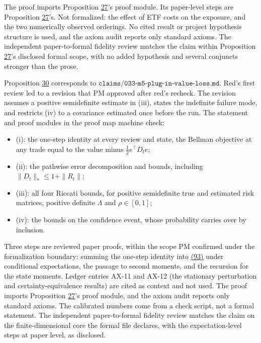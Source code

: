 \documentclass[11pt]{article}
\begin{document}
The proof imports Proposition \hyperref[res:Proposition-27]{27}'s proof module. Its paper-level
steps are Proposition \hyperref[res:Proposition-27]{27}'s. Not formalized: the effect of ETF costs
on the exposure, and the two numerically observed orderings. No cited
result or project hypothesis structure is used, and the axiom audit
reports only standard axioms. The independent paper-to-formal
fidelity review matches the claim within Proposition \hyperref[res:Proposition-27]{27}'s disclosed
formal scope, with no added hypothesis and several conjuncts stronger
than the prose.

Proposition \hyperref[res:Proposition-30]{30} corresponds to
\(\texttt{claims/033-m5-plug-in-value-loss.md}\). Red's first review
led to a revision that PM approved after red's recheck. The revision
assumes a positive semidefinite estimate in (iii), states the
indefinite failure mode, and restricts (iv) to a covariance estimated
once before the run. The statement and proof modules in the proof map
machine check:

\begin{itemize}
  \item (i): the one-step identity at every review and state, the Bellman
  objective at any trade equal to the value minus \(\frac12e^\top D_te\);
  \item (ii): the pathwise error decomposition and bounds, including
  \(\|D_t\|_*\leq1+\|R_t\|\);
  \item (iii): all four Riccati bounds, for positive semidefinite true and
  estimated risk matrices, positive definite \(\Lambda\) and
  \(\rho\in[0,1]\);
  \item (iv): the bounds on the confidence event, whose probability carries
  over by inclusion.
\end{itemize}

Three steps are reviewed paper proofs, within the scope PM confirmed
under the formalization boundary: summing the one-step identity into
\hyperref[eq:93]{(93)} under conditional expectations, the passage to second moments,
and the recursion for the state moments. Ledger entries AX-11 and
AX-12 (the stationary perturbation and certainty-equivalence results)
are cited as context and not used. The proof imports Proposition \hyperref[res:Proposition-27]{27}'s
proof module, and the axiom audit reports only standard axioms. The
calibrated numbers come from a check script, not a formal statement.
The independent paper-to-formal fidelity review matches the claim on
the finite-dimensional core the formal file declares, with the
expectation-level steps at paper level, as disclosed.
\end{document}
